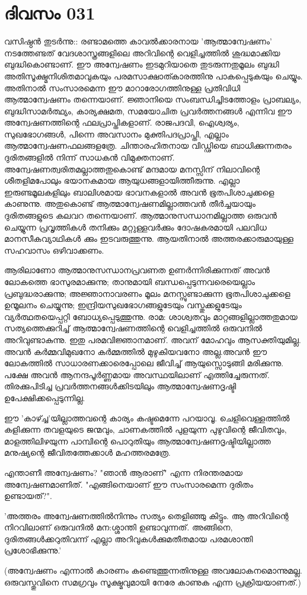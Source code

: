  
\section{ദിവസം 031}


വസിഷ്ഠന്‍ തുടര്‍ന്നു:: രണ്ടാമത്തെ കാവല്‍ക്കാരനായ 'ആത്മാന്വേഷണം' നടത്തേണ്ടത്‌ വേദശാസ്ത്രങ്ങളിലെ അറിവിന്റെ വെളിച്ചത്തില്‍ ശുദ്ധമാക്കിയ ബുദ്ധികൊണ്ടാണ്‌. ഈ അന്വേഷണം ഇടമുറിയാതെ തുടരുന്നതുമൂലം ബുദ്ധി അതിസൂക്ഷ്മനിശിതമാവുകയും പരമസാക്ഷാത്കാരത്തിനു പാകപ്പെടുകയും ചെയ്യും. അതിനാല്‍ സംസാരമെന്ന ഈ മാറാരോഗത്തിനുള്ള പ്രതിവിധി ആത്മാന്വേഷണം തന്നെയാണ്‌. ജ്ഞാനിയെ സംബന്ധിച്ചിടത്തോളം പ്രാബല്യം, ബുദ്ധിസാമര്‍ത്ഥ്യം, കാര്യക്ഷമത, സമയോചിത പ്രവര്‍ത്തനങ്ങള്‍ എന്നിവ ഈ അന്വേഷണത്തിന്റെ ഫലപ്രാപ്തികളാണ്‌. രാജപദവി, ഐശ്വര്യം, സുഖഭോഗങ്ങള്‍, പിന്നെ അവസാനം മുക്തിപദപ്രാപ്തി, എല്ലാം ആത്മാന്വേഷണഫലങ്ങളത്രേ. ചിന്താരഹിതനായ വിഡ്ഢിയെ ബാധിക്കുന്നതരം ദുരിതങ്ങളില്‍ നിന്ന് സാധകന്‍ വിമുക്തനാണ്‌. അന്വേഷണത്വരിതമല്ലാത്തതുകൊണ്ട്‌ മന്ദമായ മനസ്സിന്‌ നിലാവിന്റെ ശീതളിമപോലും ഭയാനകമായ ആയുധങ്ങളായിത്തീരുന്നു. എല്ലാ ഇരുണ്ടമൂലകളിലും ബാലിശമായ ഭാവനകളാല്‍ അവന്‍ ഭൂതപിശാചുക്കളെ കാണുന്നു. അതുകൊണ്ട്‌ ആത്മാന്വേഷണമില്ലാത്തവന്‍ തീര്‍ച്ചയായും ദുരിതങ്ങളുടെ കലവറ തന്നെയാണ്‌. ആത്മാനുസന്ധാനമില്ലാത്ത ഒരുവന്‍ ചെയ്യുന്ന പ്രവൃത്തികള്‍ തനിക്കും മറ്റുള്ളവര്‍ക്കും ദോഷകരമായി പലവിധ മാനസീകവ്യാഥികള്‍ ക്കും ഇടവരുത്തുന്നു. ആയതിനാല്‍ അത്തരക്കാരുമായുള്ള സഹവാസം ഒഴിവാക്കണം.

ആരിലാണോ ആത്മാനുസന്ധാനപ്രവണത ഉണര്‍ന്നിരിക്കുന്നത്‌ അവന്‍ ലോകത്തെ ഭാസുരമാക്കുന്നു; താനുമായി ബന്ധപ്പെടുന്നവരെയെല്ലാം പ്രബുദ്ധരാക്കുന്നു; അജ്ഞാനാവരണം മൂലം മനസ്സുണ്ടാക്കുന്ന ഭൂതപിശാചുക്കളെ ഉന്മൂലനം ചെയ്യുന്നു; ഇന്ദ്രിയസുഖഭോഗങ്ങളുടേയും വസ്തുക്കളുടേയും വ്യര്‍ത്ഥതയെപ്പറ്റി ബോധ്യപ്പെടുത്തുന്നു. രാമ: ശാശ്വതവും മാറ്റങ്ങളില്ലാത്തതുമായ സത്യത്തെക്കുറിച്ച്‌ ആത്മാന്വേഷണത്തിന്റെ വെളിച്ചത്തില്‍ ഒരുവനില്‍ അറിവുണ്ടാകുന്നു. ഇതു പരമവിജ്ഞാനമാണ്‌. അവന്‌ മോഹവും ആസക്തിയുമില്ല. അവന്‍ കര്‍മ്മവിമുഖനോ കര്‍മ്മത്തില്‍ മുഴുകിയവനോ അല്ല.അവന്‍ ഈ ലോകത്തില്‍ സാധാരണക്കാരെപ്പോലെ ജീവിച്ച്‌ ആയുസ്സൊടുങ്ങി മരിക്കുന്നു. പക്ഷേ അവന്‍ ആനന്ദപൂര്‍ണ്ണമായ അവസ്ഥയിലാണ്‌ എത്തിച്ചേരുന്നത്‌. തിരക്കുപിടിച്ച പ്രവര്‍ത്തനങ്ങള്‍ക്കിടയിലും ആത്മാന്വേഷണദൃഷ്ടി ഉപേക്ഷിക്കപ്പെടുന്നില്ല. 

ഈ 'കാഴ്ച്ച'യില്ലാത്തവന്റെ കാര്യം കഷ്ടമെന്നേ പറയാവൂ. ചെളിവെള്ളത്തില്‍ കളിക്കുന്ന തവളയുടെ ജന്മവും, ചാണകത്തില്‍ പുളയുന്ന പുഴുവിന്റെ ജീവിതവും, മാളത്തിലിഴയുന്ന പാമ്പിന്റെ പൊറുതിയും ആത്മാന്വേഷണദൃഷ്ടിയില്ലാത്ത മനുഷ്യന്റെ ജീവിതത്തേക്കാള്‍ മഹത്തരമത്രേ. 

എന്താണീ അന്വേഷണം? "ഞാന്‍ ആരാണ്‌" എന്ന നിരന്തരമായ അന്വേഷണമാണിത്‌. "എങ്ങിനെയാണ്‌ ഈ സംസാരമെന്ന ദുരിതം ഉണ്ടായത്‌?". 

'അത്തരം അന്വേഷണത്തില്‍നിന്നും സത്യം തെളിഞ്ഞു കിട്ടും. ആ അറിവിന്റെ നിറവിലാണ്‌ ഒരുവനില്‍ മന:ശ്ശാന്തി ഉണ്ടാവുന്നത്‌. അങ്ങിനെ, ദുരിതങ്ങള്‍ക്കറുതിവന്ന് എല്ലാ അറിവുകള്‍ക്കുമതീതമായ പരമശാന്തി പ്രശോഭിക്കുന്നു.'

(അന്വേഷണം എന്നാല്‍ കാരണം കണ്ടെത്തുന്നതിനുള്ള അവലോകനമൊന്നുമല്ല. ഒരുവസ്തുവിനെ സമഗ്രവും സൂക്ഷ്മവുമായി നേരേ കാണുക എന്ന പ്രക്രിയയാണത്‌.) 
